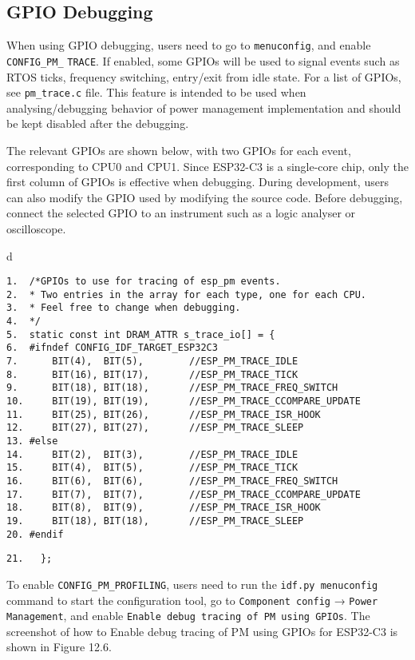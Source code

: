 \documentclass[a4paper,12pt]{book}
\begin{document}
\subsection{GPIO Debugging}
When using GPIO debugging, users need to go to \verb|menuconfig|, and enable \verb|CONFIG_PM_| \verb|TRACE|. If enabled, some GPIOs will be used to signal events such as RTOS ticks, frequency switching, entry/exit from idle state. For a list of GPIOs, see \verb|pm_trace.c| file. This feature is intended to be used when analysing/debugging behavior of power management implementation and should be kept disabled after the debugging.

The relevant GPIOs are shown below, with two GPIOs for each event, corresponding to CPU0 and CPU1. Since ESP32-C3 is a single-core chip, only the first column of GPIOs is effective when debugging. During development, users can also modify the GPIO used by modifying the source code. Before debugging, connect the selected GPIO to an instrument such as a logic analyser or oscilloscope.

\begin{codebloc}
\begin{tabular}{d}
\vspace{2pt}
\begin{verbatim}
1.	/*GPIOs to use for tracing of esp_pm events.
2.	* Two entries in the array for each type, one for each CPU.
3.	* Feel free to change when debugging.
4.	*/
5.	static const int DRAM_ATTR s_trace_io[] = {
6.	#ifndef CONFIG_IDF_TARGET_ESP32C3
7. 	    BIT(4),  BIT(5),  		//ESP_PM_TRACE_IDLE
8. 	    BIT(16), BIT(17), 		//ESP_PM_TRACE_TICK
9. 	    BIT(18), BIT(18), 		//ESP_PM_TRACE_FREQ_SWITCH
10.     BIT(19), BIT(19), 		//ESP_PM_TRACE_CCOMPARE_UPDATE
11.     BIT(25), BIT(26), 		//ESP_PM_TRACE_ISR_HOOK
12.     BIT(27), BIT(27), 		//ESP_PM_TRACE_SLEEP
13.	#else
14.     BIT(2),  BIT(3),  		//ESP_PM_TRACE_IDLE
15.     BIT(4),  BIT(5),  		//ESP_PM_TRACE_TICK
16.     BIT(6),  BIT(6),  		//ESP_PM_TRACE_FREQ_SWITCH
17.     BIT(7),  BIT(7),  		//ESP_PM_TRACE_CCOMPARE_UPDATE
18.     BIT(8),  BIT(9),  		//ESP_PM_TRACE_ISR_HOOK
19.     BIT(18), BIT(18), 		//ESP_PM_TRACE_SLEEP
20.	#endif
\end{verbatim}
\verb|21.	};|
\end{tabular}
\end{codebloc}

To enable \verb|CONFIG_PM_PROFILING|, users need to run the \verb|idf.py menuconfig| command to start the configuration tool, go to \verb|Component config| → \verb|Power Management|, and enable \verb|Enable debug tracing of PM using GPIOs|. The screenshot of how to Enable debug tracing of PM using GPIOs for ESP32-C3 is shown in Figure 12.6.
\end{document}
